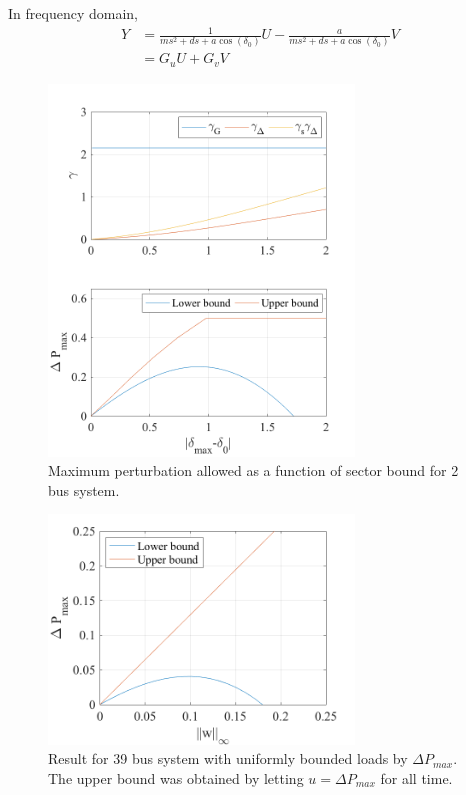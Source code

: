 \documentclass[journal]{IEEEtran}
\theoremstyle{definition}
\begin{document}
In frequency domain,
\begin{equation}
\begin{aligned}
Y&=\frac{1}{ms^2+ds+a\cos(\delta_0)}U-\frac{a}{ms^2+ds+a\cos(\delta_0)}V \\
&=G_uU+G_vV
\end{aligned}
\end{equation}

\begin{figure}[!htbp]
	\centering
	\includegraphics[width=3.2in]{picture/max_pert_2bus.png}
	\caption{Maximum perturbation allowed as a function of sector bound for 2 bus system.}
	\label{fig_max_perturbation_2bus}
\end{figure}


\begin{figure}[!htbp]
	\centering
	\includegraphics[width=3.2in]{picture/max_pert_39bus_loads.png}
	\caption{Result for 39 bus system with uniformly bounded loads by $\Delta P_{max}$. The upper bound was obtained by letting $u =\Delta P_{max}$ for all time.}
	\label{fig_max_perturbation_2bus}
\end{figure}
\end{document}
